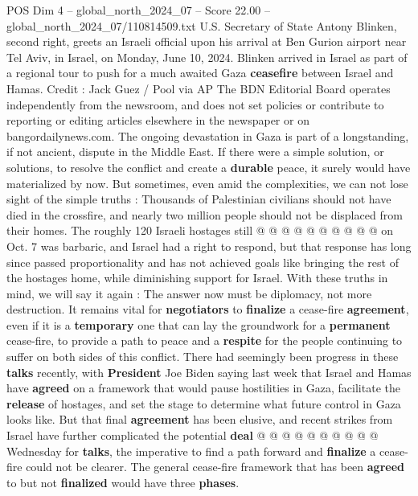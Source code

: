 \begin{textsample}{POS Dim 4 – global\_north\_2024\_07 – Score 22.00 – global\_north\_2024\_07/110814509.txt}  \label{ex:f4_pos_198}
U.S.
Secretary of State Antony Blinken, second right, greets an Israeli official upon his arrival at Ben Gurion airport near Tel Aviv, in Israel, on Monday, June 10, 2024.
Blinken arrived in Israel as part of a regional tour to push for a much awaited Gaza \textbf{ceasefire} between Israel and Hamas.
Credit : Jack Guez / Pool via AP The BDN Editorial Board operates independently from the newsroom, and does not set policies or contribute to reporting or editing articles elsewhere in the newspaper or on bangordailynews.com.
The ongoing devastation in Gaza is part of a longstanding, if not ancient, dispute in the Middle East.
If there were a simple solution, or solutions, to resolve the conflict and create a \textbf{durable} peace, it surely would have materialized by now.
But sometimes, even amid the complexities, we can not lose sight of the simple truths : Thousands of Palestinian civilians should not have died in the crossfire, and nearly two million people should not be displaced from their homes.
The roughly 120 Israeli hostages still @ @ @ @ @ @ @ @ @ @ on Oct. 7 was barbaric, and Israel had a right to respond, but that response has long since passed proportionality and has not achieved goals like bringing the rest of the hostages home, while diminishing support for Israel.
With these truths in mind, we will say it again : The answer now must be diplomacy, not more destruction.
It remains vital for \textbf{negotiators} to \textbf{finalize} a cease-fire \textbf{agreement}, even if it is a \textbf{temporary} one that can lay the groundwork for a \textbf{permanent} cease-fire, to provide a path to peace and a \textbf{respite} for the people continuing to suffer on both sides of this conflict.
There had seemingly been progress in these \textbf{talks} recently, with \textbf{President} Joe Biden saying last week that Israel and Hamas have \textbf{agreed} on a framework that would pause hostilities in Gaza, facilitate the \textbf{release} of hostages, and set the stage to determine what future control in Gaza looks like.
But that final \textbf{agreement} has been elusive, and recent strikes from Israel have further complicated the potential \textbf{deal} @ @ @ @ @ @ @ @ @ @ Wednesday for \textbf{talks}, the imperative to find a path forward and \textbf{finalize} a cease-fire could not be clearer.
The general cease-fire framework that has been \textbf{agreed} to but not \textbf{finalized} would have three \textbf{phases}.

\end{textsample}
